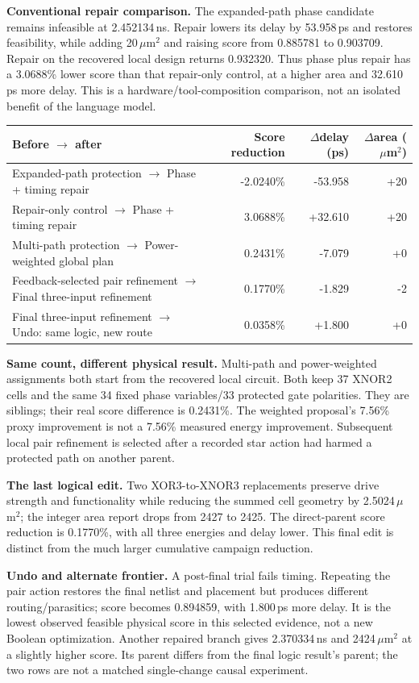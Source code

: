 \documentclass[10pt]{article}
\begin{document}
\textbf{Conventional repair comparison.} The expanded-path phase candidate remains infeasible at 2.452134\,ns. Repair lowers its delay by 53.958\,ps and restores feasibility, while adding 20\,$\mu$m$^2$ and raising score from 0.885781 to 0.903709. Repair on the recovered local design returns 0.932320. Thus phase plus repair has a 3.0688\% lower score than that repair-only control, at a higher area and 32.610\,ps more delay. This is a hardware/tool-composition comparison, not an isolated benefit of the language model.
\begin{center}\small\setlength{\tabcolsep}{5pt}\begin{tabular}{@{}p{8.0cm}rrr@{}}\toprule
Before $\rightarrow$ after & Score reduction & $\Delta$delay (ps)&$\Delta$area ($\mu$m$^2$)\\\midrule
Expanded-path protection $\rightarrow$ Phase + timing repair & -2.0240\% & -53.958 & +20\\
Repair-only control $\rightarrow$ Phase + timing repair & 3.0688\% & +32.610 & +20\\
Multi-path protection $\rightarrow$ Power-weighted global plan & 0.2431\% & -7.079 & +0\\
Feedback-selected pair refinement $\rightarrow$ Final three-input refinement & 0.1770\% & -1.829 & -2\\
Final three-input refinement $\rightarrow$ Undo: same logic, new route & 0.0358\% & +1.800 & +0\\
\bottomrule\end{tabular}\end{center}
\textbf{Same count, different physical result.} Multi-path and power-weighted assignments both start from the recovered local circuit. Both keep 37 XNOR2 cells and the same 34 fixed phase variables/33 protected gate polarities. They are siblings; their real score difference is 0.2431\%. The weighted proposal's 7.56\% proxy improvement is not a 7.56\% measured energy improvement. Subsequent local pair refinement is selected after a recorded star action had harmed a protected path on another parent.

\textbf{The last logical edit.} Two XOR3-to-XNOR3 replacements preserve drive strength and functionality while reducing the summed cell geometry by 2.5024\,$\mu$m$^2$; the integer area report drops from 2427 to 2425. The direct-parent score reduction is 0.1770\%, with all three energies and delay lower. This final edit is distinct from the much larger cumulative campaign reduction.

\textbf{Undo and alternate frontier.} A post-final trial fails timing. Repeating the pair action restores the final netlist and placement but produces different routing/parasitics; score becomes 0.894859, with 1.800\,ps more delay. It is the lowest observed feasible physical score in this selected evidence, not a new Boolean optimization. Another repaired branch gives 2.370334\,ns and 2424\,$\mu$m$^2$ at a slightly higher score. Its parent differs from the final logic result's parent; the two rows are not a matched single-change causal experiment.
\end{document}
